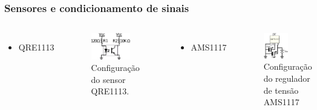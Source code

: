 \begin{frame}
\frametitle{Sensores e condicionamento de sinais}
\begin{columns}

	\begin{itemize}
	\item QRE1113
	\end{itemize}
	\begin{figure}[th]
	\centering
	\captionsetup{width=0.8\textwidth,font=footnotesize,textfont=bf}
	\includegraphics[width=0.8\textwidth,keepaspectratio]{Figuras/qre.pdf}
	\caption{Configuração do sensor QRE1113.}
	\end{figure}


	\pause
	\begin{itemize}
	\item AMS1117
	\end{itemize}
	\begin{figure}[th]
	\centering
	\captionsetup{width=0.9\textwidth,font=footnotesize,textfont=bf}
	\includegraphics[width=0.5\textwidth,keepaspectratio]{Figuras/ams.pdf}
	\caption{Configuração do regulador de tensão AMS1117}
	\end{figure}

\end{columns}
\end{frame}

